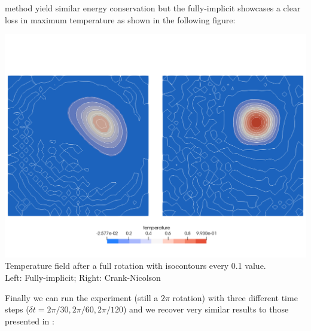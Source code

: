method yield similar energy conservation but the fully-implicit showcases a clear loss in maximum temperature as shown in the following figure:
\begin{center}
\includegraphics[width=15cm]{python_codes/fieldstone_43/images/temp}\\
{\small Temperature field after a full rotation with isocontours every 0.1 value.\\ Left: Fully-implicit; Right: Crank-Nicolson}
\end{center}
Finally we can run the experiment (still a $2\pi$ rotation) 
with three different time steps ($\delta t=2\pi/30,2\pi/60,2\pi/120$) and we recover very similar results to 
those presented in \cite{dohu03}:

